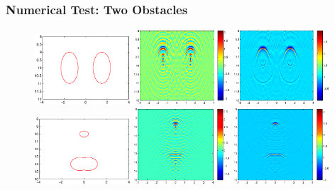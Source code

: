 \documentclass[cjk,8pt]{beamer}
\begin{document}
\begin{CJK*}{GBK}{kai}
\begin{frame}
\frametitle{Numerical Test: Two Obstacles}
\begin{figure}[h]
	
	\includegraphics[width=0.32\textwidth,height=0.31\textheight]{./graphic/bi_circle_profile.eps}
	\includegraphics[width=0.32\textwidth]{./graphic/bi_circle_3pi.eps}
	\includegraphics[width=0.32\textwidth]{./graphic/bi_circle.eps}\\
	\includegraphics[width=0.32\textwidth,height=0.31\textheight]{./graphic/circle_0_4_peanut_1_profile.eps}
	\includegraphics[width=0.32\textwidth]{./graphic/circle_0_4_peanut_1_3pi_1.eps}
	\includegraphics[width=0.32\textwidth]{./graphic/circle_0_4_peanut_1_multi_1.eps}
	

\end{figure}
\end{frame}
\end{CJK*}
\end{document}
